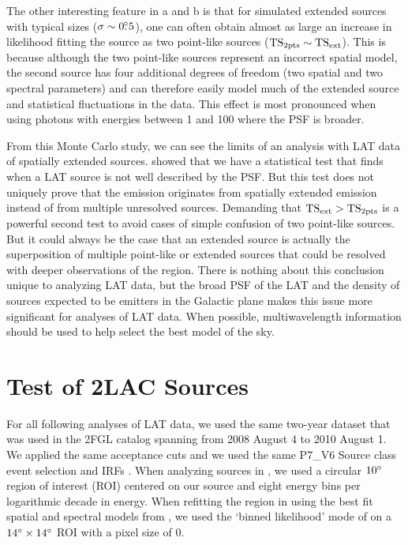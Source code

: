 The other interesting feature in a
and b is that for simulated extended
sources with typical sizes ($\sigma\sim0\mbox{$.\!\!^\circ$}5$), one can often obtain
almost as large an increase in likelihood fitting the source as two
point-like sources ($\mathrm{TS}_{\mathrm{2pts}}\sim\mathrm{TS}_\mathrm{ext}$).  This is because although the
two point-like sources represent an incorrect spatial model, the second
source has four additional degrees of freedom (two spatial and two
spectral parameters) and can therefore easily model much of the extended
source and statistical fluctuations in the data.  This effect is most
pronounced when using photons with energies between 1 \gev and 100 \gev
where the PSF is broader.

From this Monte Carlo study, we can see the limits of an analysis with
LAT data of spatially extended sources.  
showed that we have a statistical test that finds when a LAT source is
not well described by the PSF.  But this test does not uniquely prove
that the emission originates from spatially extended emission instead
of from multiple unresolved sources.  Demanding that $\mathrm{TS}_\mathrm{ext}>\mathrm{TS}_{\mathrm{2pts}}$
is a powerful second test to avoid cases of simple confusion of two
point-like sources. But it could always be the case that an extended
source is actually the superposition of multiple point-like or
extended sources that could be resolved with deeper observations of the
region.  There is nothing about this conclusion unique to analyzing LAT data,
but the broad PSF of the LAT and the density of sources expected to be
\gev emitters in the Galactic plane makes this issue more significant
for analyses of LAT data.  When possible, multiwavelength information should be
used to help select the best model of the sky.


\section{Test of 2LAC Sources}


For all following analyses of LAT data, we used the same two-year dataset
that was used in the 2FGL catalog spanning from 2008 August 4 to 2010 August 1. We
applied the same acceptance cuts and we used the same P7\_V6 Source class
event selection and IRFs \citep{ackermann_2012a_fermi-large}.  
When analyzing sources in \pointlike, we used a circular $10^\circ$ region of
interest (ROI) centered on our source and eight energy bins per
logarithmic decade in energy.
When refitting the region in \gtlike using the best fit spatial and
spectral models from \pointlike, we used the `binned likelihood' mode of
\gtlike on a $14^\circ\times14^\circ$ ROI with a pixel size of 0.

